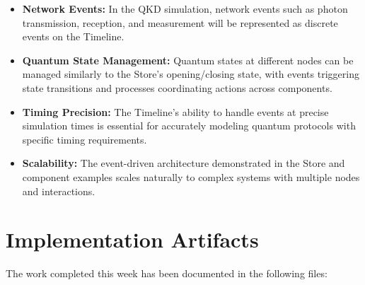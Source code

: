 \begin{itemize}
    \item \textbf{Network Events:} In the QKD simulation, network events such as photon transmission, reception, and measurement will be represented as discrete events on the Timeline.
    
    \item \textbf{Quantum State Management:} Quantum states at different nodes can be managed similarly to the Store's opening/closing state, with events triggering state transitions and processes coordinating actions across components.
    
    \item \textbf{Timing Precision:} The Timeline's ability to handle events at precise simulation times is essential for accurately modeling quantum protocols with specific timing requirements.
    
    \item \textbf{Scalability:} The event-driven architecture demonstrated in the Store and component examples scales naturally to complex systems with multiple nodes and interactions.
\end{itemize}

\section{Implementation Artifacts}

The work completed this week has been documented in the following files:

